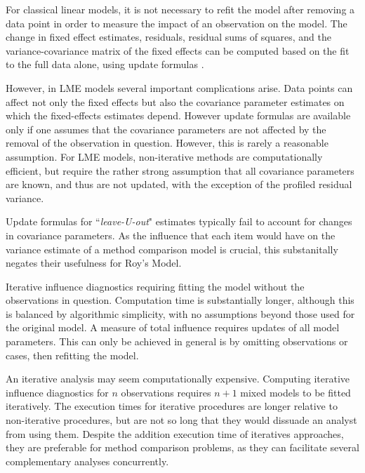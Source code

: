 \documentclass[12pt, a4paper]{report}
\theoremstyle{definition}
\theoremstyle{remark}
\begin{document}
For classical linear models, it is not necessary to refit the model after removing a data point in order to measure the impact of an observation on the model. The change in fixed effect estimates, residuals, residual sums of squares, and the variance-covariance matrix of the fixed effects can be computed based on the fit to the full data alone, using update formulas \citep{sherman, hager1989}.


However, in LME models several important complications arise. Data points can affect not only the fixed effects but also the covariance parameter estimates on which the fixed-effects estimates depend. However update formulas are available only if one assumes that the covariance parameters are not affected by the removal of the observation in question. However, this is rarely a reasonable assumption.
For LME models, non-iterative methods are computationally efficient, but require the rather strong assumption that all covariance parameters are known, and thus are not updated, with the exception of the profiled residual variance.
                                                                                                                                
Update formulas for ``\textit{leave-U-out}" estimates typically fail to account for changes in covariance parameters.  As the influence that each item would have on the variance estimate of a method comparison model is crucial, this substanitally negates their usefulness for Roy's Model.

Iterative influence diagnostics requiring fitting the model without the observations in question. Computation time is substantially longer, although this is balanced by algorithmic simplicity, with no assumptions beyond those used for the original model. A measure of total influence requires updates of all model parameters. This can only be achieved in general is by omitting observations or cases, then refitting the model. 


An iterative analysis may seem computationally expensive. Computing iterative influence diagnostics for $n$ observations requires $n+1$ mixed models to be fitted iteratively.
The execution times for iterative procedures are longer relative to non-iterative procedures, but are not so long that they would dissuade an analyst from using them.
Despite the addition execution time of iteratives
approaches, they are preferable for method comparison problems, as they can facilitate several complementary analyses concurrently. 
\end{document}
